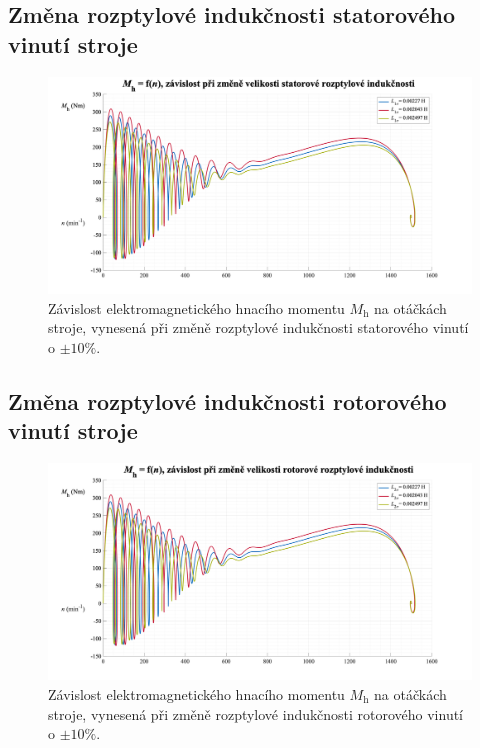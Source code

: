 \documentclass[a4paper, twoside, 11pt]{article}
\newcommand{\fbar}{\FloatBarrier}
\begin{document}
    \fbar
    \subsection{Změna rozptylové indukčnosti statorového vinutí stroje}
        \begin{figure}[htbp!]
            \centering
            \includegraphics[width=1\textwidth]{src/png/mh_dyn_nGraphL1sigma.png}
            \caption{Závislost elektromagnetického hnacího momentu $M_\text{h}$ na otáčkách stroje, vynesená při změně rozptylové indukčnosti statorového vinutí o $\pm 10 \%$.}
            \label{fig:mh_dyn_nGraphL1sigma}
        \end{figure}

    \fbar
    \subsection{Změna rozptylové indukčnosti rotorového vinutí stroje}
        \begin{figure}[htbp!]
            \centering
            \includegraphics[width=1\textwidth]{src/png/mh_dyn_nGraphL2sigma.png}
            \caption{Závislost elektromagnetického hnacího momentu $M_\text{h}$ na otáčkách stroje, vynesená při změně rozptylové indukčnosti rotorového vinutí o $\pm 10 \%$.}
            \label{fig:mh_dyn_nGraphL2sigma}
        \end{figure}
\end{document}
